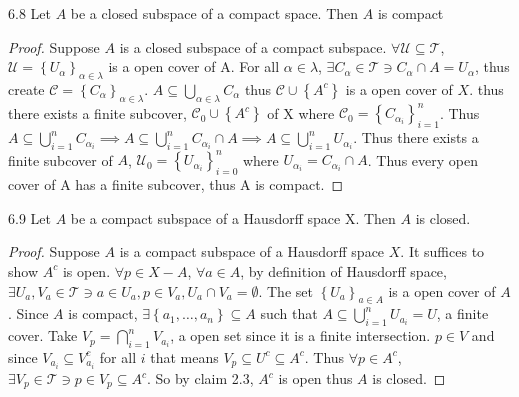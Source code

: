 \documentclass{article}
\newcommand*{\T}{\mathcal{T}}
\newcommand*{\subeq}{\subseteq}
\newcommand*{\empset}{\emptyset}
\begin{document}
\bigskip

\begin{claim}{6.8}\label{Claim 6.6.}
    Let $A$ be a closed subspace of a compact space. Then $A$ is compact  
\end{claim}
\begin{proof}
    Suppose $A$ is a closed subspace of a compact subspace. $\forall \mathcal{U} \subseteq \T$, $\mathcal{U} = \left\{ U_{\alpha} \right\}_{\alpha \in \lambda}$ is a open cover of A. For all $\alpha \in \lambda$, $\exists C_\alpha \in \T \ni C_\alpha \cap A = U_\alpha$, thus create $\mathcal{C} = \left\{ C_\alpha \right\}_{\alpha \in \lambda}$. $A \subseteq \bigcup_{\alpha \in \lambda} C_\alpha$ thus $\mathcal{C} \cup \left\{  A^c\right\}$ is a open cover of $X$. thus there exists a finite subcover, $\mathcal{C}_0 \cup \left\{ A^c \right\}$ of X where $\mathcal{C}_0 = \left\{ C_{\alpha_i} \right\}_{i = 1}^n$. Thus $A \subseteq \bigcup_{i = 1}^{n} C_{\alpha_i}\implies A \subseteq \bigcup_{i = 1}^n C_{\alpha_i} \cap A \implies A \subseteq \bigcup_{i = 1}^n U_{\alpha_i}$. Thus there exists a finite subcover of $A$, $\mathcal{U}_0 = \left\{ U_{\alpha_i} \right\}_{i = 0}^n$ where $U_{\alpha_i} = C_{\alpha_i} \cap A$. Thus every open cover of A has a finite subcover, thus A is compact.                 
\end{proof}

\bigskip

\begin{claim}{6.9}\label{Claim 6.9.}
    Let $A$ be a compact subspace of a Hausdorff space X. Then $A$ is closed.   
\end{claim}
\begin{proof}
    Suppose $A$ is a compact subspace of a Hausdorff space $X$. It suffices to show $A^c$ is open. $\forall p \in X - A$, $\forall a \in A$, by definition of Hausdorff space, $\exists U_a, V_a \in \T \ni a \in U_a, p \in V_a, U_a \cap V_a = \empset$. The set $\left\{ U_a \right\}_{a \in A}$ is a open cover of $A$. Since $A$ is compact, $\exists \left\{ a_1, \dots, a_n \right\}\subseteq A$ such that $A \subeq \bigcup_{i = 1}^n U_{a_i} = U$, a finite cover. Take $V_p = \bigcap_{i = 1}^n V_{a_i}$, a open set since it is a finite intersection. $p \in V$ and since $V_{a_i} \subeq V_{a_i}^c$ for all $i$ that means $V_p \subseteq U^c \subeq A^c$. Thus $\forall p \in A^c$, $\exists V_p \in \T \ni p \in V_p \subseteq A^c$. So by claim 2.3, $A^c$ is open thus $A$ is closed.                            
\end{proof}
\end{document}
